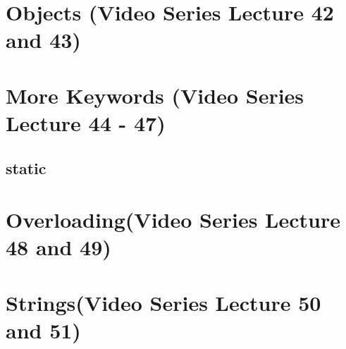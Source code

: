 \documentclass[11]{article}
\begin{document}
\section{Objects (Video Series Lecture 42 and 43)}
\section{More Keywords (Video Series Lecture 44 - 47)}
\subsection{static}
\section{Overloading(Video Series Lecture 48 and 49)}
\section{Strings(Video Series Lecture 50 and 51)}
\end{document}

